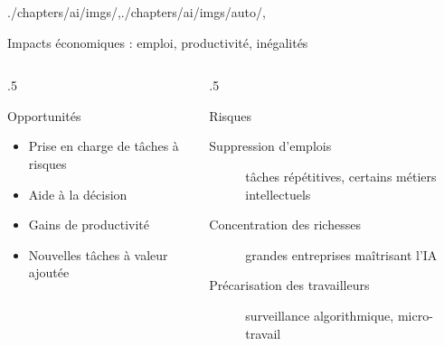 \begin{graphicspathcontext}{{./chapters/ai/imgs/},{./chapters/ai/imgs/auto/},\old}

\begin{frame}[t]{{Impacts économiques :} emploi, productivité, inégalités}
	\vspace{-.25cm}
	\begin{columns}[T]
		\begin{column}{.5\linewidth}
			\begin{block}{Opportunités}
				\begin{itemize}
				\item Prise en charge de tâches à risques
				\item Aide à la décision
				\item Gains de productivité%
				\item Nouvelles tâches à valeur ajoutée
				\end{itemize}
			\end{block}
		\end{column}
		\begin{column}{.5\linewidth}
			\begin{block}{Risques}
				\begin{description}
				\item[Suppression d'emplois] tâches répétitives, certains métiers intellectuels%
				\item[Concentration des richesses] grandes entreprises maîtrisant l'IA%
				\item[Précarisation des travailleurs] surveillance algorithmique, micro-travail%
				\end{description}
			\end{block}
		\end{column}
	\end{columns}
	\vspace{.5cm}
\end{frame}

\end{graphicspathcontext}

\endinput
